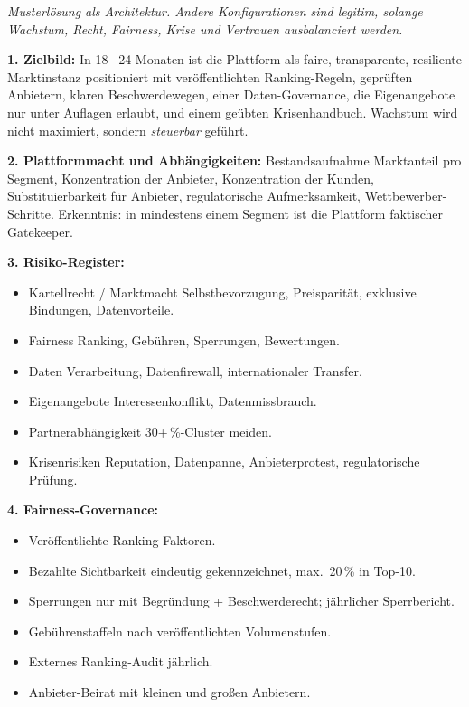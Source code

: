 \documentclass[11pt,a4paper,oneside]{article}
\begin{document}
\begin{loesungbox}
\emph{Musterlösung als Architektur. Andere Konfigurationen sind legitim, solange Wachstum, Recht, Fairness, Krise und Vertrauen ausbalanciert werden.}

\smallskip
\textbf{1. Zielbild:}
In 18\,--\,24 Monaten ist die Plattform als faire, transparente, resiliente Marktinstanz positioniert \textendash{} mit veröffentlichten Ranking-Regeln, geprüften Anbietern, klaren Beschwerdewegen, einer Daten-Governance, die Eigenangebote nur unter Auflagen erlaubt, und einem geübten Krisenhandbuch. Wachstum wird nicht maximiert, sondern \emph{steuerbar} geführt.

\smallskip
\textbf{2. Plattformmacht und Abhängigkeiten:} Bestandsaufnahme \textendash{} Marktanteil pro Segment, Konzentration der Anbieter, Konzentration der Kunden, Substituierbarkeit für Anbieter, regulatorische Aufmerksamkeit, Wettbewerber-Schritte. Erkenntnis: in mindestens einem Segment ist die Plattform faktischer Gatekeeper.

\smallskip
\textbf{3. Risiko-Register:}
\begin{itemize}
  \item Kartellrecht / Marktmacht \textrightarrow{} Selbstbevorzugung, Preisparität, exklusive Bindungen, Datenvorteile.
  \item Fairness \textrightarrow{} Ranking, Gebühren, Sperrungen, Bewertungen.
  \item Daten \textrightarrow{} Verarbeitung, Datenfirewall, internationaler Transfer.
  \item Eigenangebote \textrightarrow{} Interessenkonflikt, Datenmissbrauch.
  \item Partnerabhängigkeit \textrightarrow{} 30+\,\%-Cluster meiden.
  \item Krisenrisiken \textrightarrow{} Reputation, Datenpanne, Anbieterprotest, regulatorische Prüfung.
\end{itemize}

\textbf{4. Fairness-Governance:}
\begin{itemize}
  \item Veröffentlichte Ranking-Faktoren.
  \item Bezahlte Sichtbarkeit eindeutig gekennzeichnet, max.\ 20\,\% in Top-10.
  \item Sperrungen nur mit Begründung + Beschwerderecht; jährlicher Sperrbericht.
  \item Gebührenstaffeln nach veröffentlichten Volumenstufen.
  \item Externes Ranking-Audit jährlich.
  \item Anbieter-Beirat mit kleinen und großen Anbietern.
\end{itemize}


\end{loesungbox}
\end{document}
